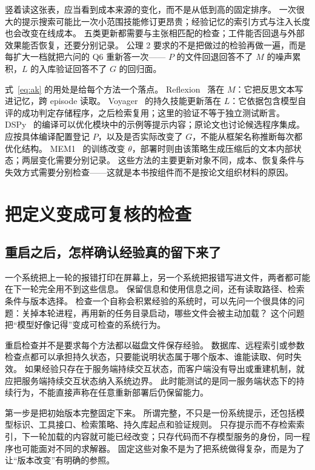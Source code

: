 竖着读这张表，应当看到成本来源的变化，而不是从低到高的固定排序。
一次很大的提示搜索可能比一次小范围技能修订更昂贵；经验记忆的索引方式与注入长度也会改变在线成本。
五类更新都需要与主张相匹配的检查；工件能否回退与外部效果能否恢复，还要分别记录。
公理 2 要求的不是把做过的检验再做一遍，而是每扩大一档就把六问的 Q6 重新答一次——
$P$ 的文件回退回答不了 $M$ 的噪声累积，$L$ 的入库验证回答不了 $G$ 的回归面。

\clearpage
式~\eqref{eq:ak} 的用处是给每个方法一个落点。
Reflexion~\cite{reflexion-2303} 落在 $M$：它把反思文本写进记忆，跨 episode 读取。
Voyager~\cite{voyager-2305} 的持久技能更新落在 $L$：它依据包含模型自评的成功判定存储程序，之后检索复用；这里的验证不等于独立测试断言。
DSPy~\cite{dspy-2310} 的编译可以优化模块中的示例等提示内容；原论文也讨论候选程序集成。应按具体编译配置登记 $P$，以及是否实际改变了 $G$，不能从框架名称推断每次都优化结构。
MEM1~\cite{mem1-2506} 的训练改变 $\theta$，部署时则由该策略生成压缩后的文本内部状态；两层变化需要分别记录。
这些方法的主要更新对象不同，成本、恢复条件与失效方式需要分别检查——这就是本书按组件而不是按论文组织材料的原因。

\section{把定义变成可复核的检查}

\subsection{重启之后，怎样确认经验真的留下来了}
\label{sec:ch01-reset-audit}

一个系统把上一轮的报错打印在屏幕上，另一个系统把报错写进文件，两者都可能在下一轮完全用不到这些信息。
保留信息和使用信息之间，还有读取路径、检索条件与版本选择。
检查一个自称会积累经验的系统时，可以先问一个很具体的问题：关掉本轮进程，再用新的任务目录启动，哪些文件会被主动加载？
这个问题把``模型好像记得''变成可检查的系统行为。

重启检查并不是要求每个方法都以磁盘文件保存经验。
数据库、远程索引或参数检查点都可以承担持久状态，只要能说明状态属于哪个版本、谁能读取、何时失效。
如果经验只存在于服务端持续交互状态，而客户端没有导出或重建机制，就应把服务端持续交互状态纳入系统边界。
此时能测试的是同一服务端状态下的持续行为，不能直接声称在任意重新部署后仍保留能力。

第一步是把初始版本完整固定下来。
所谓完整，不只是一份系统提示，还包括模型标识、工具接口、检索策略、持久库起点和验证规则。
只存提示而不存检索索引，下一轮加载的内容就可能已经改变；只存代码而不存模型服务的身份，同一程序也可能面对不同的求解器。
固定这些对象不是为了把系统做得复杂，而是为了让``版本改变''有明确的参照。

